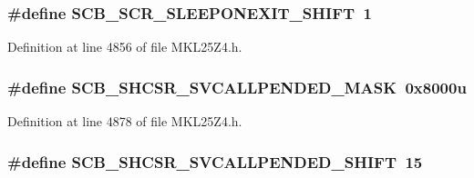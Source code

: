 \subsubsection[{\texorpdfstring{S\+C\+B\+\_\+\+S\+C\+R\+\_\+\+S\+L\+E\+E\+P\+O\+N\+E\+X\+I\+T\+\_\+\+S\+H\+I\+FT}{SCB_SCR_SLEEPONEXIT_SHIFT}}]{\setlength{\rightskip}{0pt plus 5cm}\#define S\+C\+B\+\_\+\+S\+C\+R\+\_\+\+S\+L\+E\+E\+P\+O\+N\+E\+X\+I\+T\+\_\+\+S\+H\+I\+FT~1}\hypertarget{group___s_c_b___register___masks_gafc63d56cb8407238a9abe5ad54a00809}{}\label{group___s_c_b___register___masks_gafc63d56cb8407238a9abe5ad54a00809}


Definition at line 4856 of file M\+K\+L25\+Z4.\+h.

\subsubsection[{\texorpdfstring{S\+C\+B\+\_\+\+S\+H\+C\+S\+R\+\_\+\+S\+V\+C\+A\+L\+L\+P\+E\+N\+D\+E\+D\+\_\+\+M\+A\+SK}{SCB_SHCSR_SVCALLPENDED_MASK}}]{\setlength{\rightskip}{0pt plus 5cm}\#define S\+C\+B\+\_\+\+S\+H\+C\+S\+R\+\_\+\+S\+V\+C\+A\+L\+L\+P\+E\+N\+D\+E\+D\+\_\+\+M\+A\+SK~0x8000u}\hypertarget{group___s_c_b___register___masks_gaa3091912694f50ac51a925d4d7bcf854}{}\label{group___s_c_b___register___masks_gaa3091912694f50ac51a925d4d7bcf854}


Definition at line 4878 of file M\+K\+L25\+Z4.\+h.

\subsubsection[{\texorpdfstring{S\+C\+B\+\_\+\+S\+H\+C\+S\+R\+\_\+\+S\+V\+C\+A\+L\+L\+P\+E\+N\+D\+E\+D\+\_\+\+S\+H\+I\+FT}{SCB_SHCSR_SVCALLPENDED_SHIFT}}]{\setlength{\rightskip}{0pt plus 5cm}\#define S\+C\+B\+\_\+\+S\+H\+C\+S\+R\+\_\+\+S\+V\+C\+A\+L\+L\+P\+E\+N\+D\+E\+D\+\_\+\+S\+H\+I\+FT~15}\hypertarget{group___s_c_b___register___masks_gad441fbcc06889927347ce287c2520a97}{}\label{group___s_c_b___register___masks_gad441fbcc06889927347ce287c2520a97}


